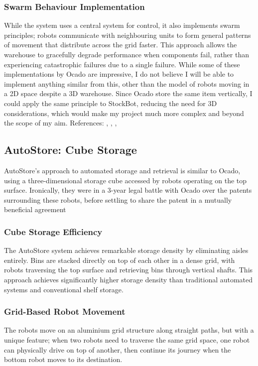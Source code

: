 \subsubsection{Swarm Behaviour Implementation}
While the system uses a central system for control, it also implements swarm principles; robots communicate with neighbouring units to form general patterns of movement that distribute across the grid faster. This approach allows the warehouse to gracefully degrade performance when components fail, rather than experiencing catastrophic failures due to a single failure. \newline
\textbf{ }
\newline While some of these implementations by Ocado are impressive, I do not believe I will be able to implement anything similar from this, other than the model of robots moving in a 2D space despite a 3D warehouse. Since Ocado store the same item vertically, I could apply the same principle to StockBot, reducing the need for 3D considerations, which would make my project much more complex and beyond the scope of my aim. \newline References: \cite{a2024_joseph}, \cite{group_2024_the}, \cite{group_2023_the}, \cite{group_2020_explained}

\newpage

\subsection{AutoStore: Cube Storage}

AutoStore's approach to automated storage and retrieval is similar to Ocado, using a three-dimensional storage cube accessed by robots operating on the top surface. Ironically, they were in a 3-year legal battle with Ocado over the patents surrounding these robots, before settling to share the patent in a mutually beneficial agreement \cite{speed_2023_ocado}

\subsubsection{Cube Storage Efficiency}
The AutoStore system achieves remarkable storage density by eliminating aisles entirely. Bins are stacked directly on top of each other in a dense grid, with robots traversing the top surface and retrieving bins through vertical shafts. This approach achieves significantly higher storage density than traditional automated systems and conventional shelf storage.

\subsubsection{Grid-Based Robot Movement}
The robots move on an aluminium grid structure along straight paths, but with a unique feature; when two robots need to traverse the same grid space, one robot can physically drive on top of another, then continue its journey when the bottom robot moves to its destination.


